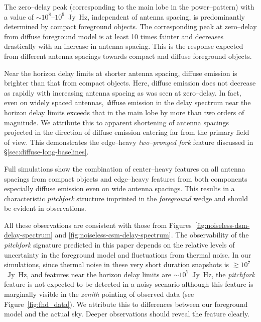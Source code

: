 \documentclass[preprint2,iop,numberedappendix]{emulateapj}
\begin{document}
The zero--delay peak (corresponding to the main lobe in the power--pattern) with a value of $\sim 10^8$--$10^9$~Jy~Hz, independent of antenna spacing, is predominantly determined by compact foreground objects. The corresponding peak at zero--delay from diffuse foreground model is at least 10 times fainter and decreases drastically with an increase in antenna spacing. This is the response expected from different antenna spacings towards compact and diffuse foreground objects. 

Near the horizon delay limits at shorter antenna spacing, diffuse emission is brighter than that from compact objects. Here, diffuse emission does not decrease as rapidly with increasing antenna spacing as was seen at zero--delay. In fact, even on widely spaced antennas, {\emph diffuse emission in the delay spectrum near the horizon delay limits exceeds that in the main lobe by more than two orders of magnitude}. We attribute this to apparent shortening of antenna spacings projected in the direction of diffuse emission entering far from the primary field of view. This demonstrates the edge--heavy {\it two--pronged fork} feature discussed in \S\ref{sec:diffuse-long-baselines}.

Full simulations show the combination of center--heavy features on all antenna spacings from compact objects and edge--heavy features from both components especially diffuse emission even on wide antenna spacings.  This results in a characteristic {\it pitchfork} structure imprinted in the {\it foreground} wedge and should be evident in observations.

All these observations are consistent with those from Figures~\ref{fig:noiseless-dsm-delay-spectrum} and \ref{fig:noiseless-csm-delay-spectrum}. The observability of the {\it pitchfork} signature predicted in this paper depends on the relative levels of uncertainty in the foreground model and fluctuations from thermal noise. In our simulations, since thermal noise in these very short duration snapshots is $\gtrsim 10^7$~Jy~Hz, and features near the horizon delay limits are $\sim 10^7$~Jy~Hz, the {\it pitchfork} feature is not expected to be detected in a noisy scenario although this feature is marginally visible in the {\it zenith} pointing of observed data (see Figure~\ref{fig:fhd_data}). We attribute this to differences between our foreground model and the actual sky.  Deeper observations should reveal the feature clearly.
\end{document}
